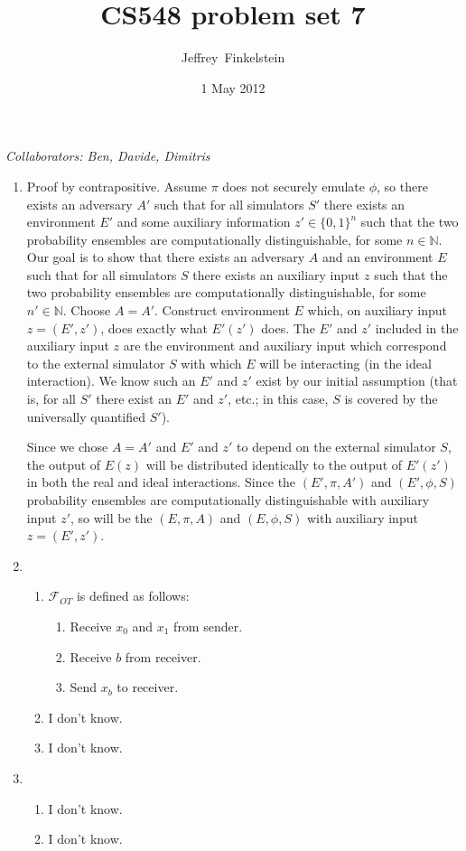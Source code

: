 \documentclass[draft]{article}
\author{Jef{}frey~Finkelstein}
\date{1 May 2012}
\title{CS548 problem set 7}
\newcommand{\collaborators}[1]{\emph{Collaborators: #1}}
\begin{document}
\maketitle
\collaborators{Ben, Davide, Dimitris}
\begin{enumerate}
\item
  Proof by contrapositive.
  Assume $\pi$ does not securely emulate $\phi$, so there exists an adversary $A'$ such that for all simulators $S'$ there exists an environment $E'$ and some auxiliary information $z'\in\{0, 1\}^n$ such that the two probability ensembles are computationally distinguishable, for some $n\in\mathbb{N}$.
  Our goal is to show that there exists an adversary $A$ and an environment $E$ such that for all simulators $S$ there exists an auxiliary input $z$ such that the two probability ensembles are computationally distinguishable, for some $n'\in\mathbb{N}$.
  Choose $A=A'$.
  Construct environment $E$ which, on auxiliary input $z=(E', z')$, does exactly what $E'(z')$ does.
  The $E'$ and $z'$ included in the auxiliary input $z$ are the environment and auxiliary input which correspond to the external simulator $S$ with which $E$ will be interacting (in the ideal interaction).
  We know such an $E'$ and $z'$ exist by our initial assumption (that is, for all $S'$ there exist an $E'$ and $z'$, etc.; in this case, $S$ is covered by the universally quantified $S'$).

  Since we chose $A=A'$ and $E'$ and $z'$ to depend on the external simulator $S$, the output of $E(z)$ will be distributed identically to the output of $E'(z')$ in both the real and ideal interactions.
  Since the $(E', \pi, A')$ and $(E', \phi, S)$ probability ensembles are computationally distinguishable with auxiliary input $z'$, so will be the $(E, \pi, A)$ and $(E, \phi, S)$ with auxiliary input $z=(E', z')$.
\item
  \begin{enumerate}
  \item $\mathcal{F}_{OT}$ is defined as follows:
    \begin{enumerate}
    \item Receive $x_0$ and $x_1$ from sender.
    \item Receive $b$ from receiver.
    \item Send $x_b$ to receiver.
    \end{enumerate}
  \item I don't know.
  \item I don't know.
  \end{enumerate}
\item
  \begin{enumerate}
  \item I don't know.
  \item I don't know.
  \end{enumerate}
\end{enumerate}
\end{document}

